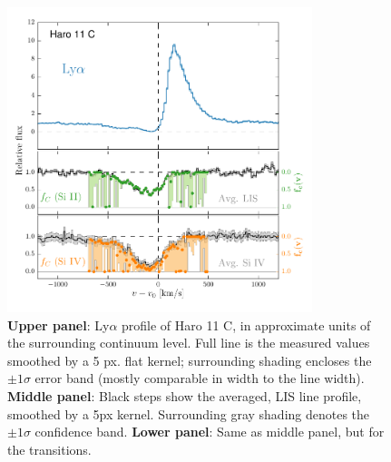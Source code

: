 \documentclass[twocolumn]{aastex61}
\begin{document}
\begin{figure}
\centering
\includegraphics[width=3.500in]{./LyACoverfracs.pdf}
\caption{\textbf{Upper panel}: Ly$\alpha$ profile of Haro 11 C, in
approximate units of the surrounding continuum level. Full line is the
measured values smoothed by a 5 px. flat kernel; surrounding shading
encloses the $\pm 1 \sigma$ error band (mostly comparable in width to
the line width). \textbf{Middle panel}: Black steps show the averaged,
LIS line profile, smoothed by a 5px kernel. Surrounding gray shading
denotes the $\pm 1 \sigma$ confidence band. \textbf{Lower panel}: Same
as middle panel, but for the  transitions.
}\label{fig:HisLisLya}
\end{figure}
\end{document}
